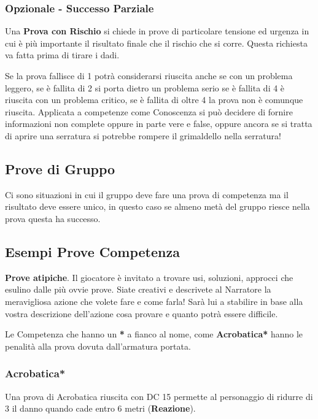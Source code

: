 \begin{multicols}{2}
\subsubsection{Opzionale - Successo Parziale}\hypertarget{successoparziale}{}\label{successoparziale}

Una \textbf{Prova con Rischio} si chiede in prove di particolare tensione ed urgenza in cui è più importante il risultato finale che il rischio che si corre. Questa richiesta va fatta prima di tirare i dadi.

Se la prova fallisce di 1 potrà considerarsi riuscita anche se con un problema leggero, se è fallita di 2 si porta dietro un problema serio se è fallita di 4 è riuscita con un problema critico, se è fallita di oltre 4 la prova non è comunque riuscita. Applicata a competenze come Conoscenza si può decidere di fornire informazioni non complete oppure in parte vere e false, oppure ancora se si tratta di aprire una serratura si potrebbe rompere il grimaldello nella serratura!

\subsection{Prove di Gruppo}\label{provedigruppo}\hypertarget{provedigruppo}{}

Ci sono situazioni in cui il gruppo deve fare una prova di competenza ma il risultato deve essere unico, in questo caso se almeno metà del gruppo riesce nella prova questa ha successo.

\subsection{Esempi Prove Competenza}\label{esempiprovecompetenza}\hypertarget{esempiprovecompetenze}{}

\textbf{Prove atipiche}. Il giocatore è invitato a trovare usi, soluzioni, approcci che esulino dalle più ovvie prove. Siate creativi e descrivete al Narratore la meravigliosa azione che volete fare e come farla! Sarà lui a stabilire in base alla vostra descrizione dell'azione cosa provare e quanto potrà essere difficile.

Le Competenza che hanno un \textbf{*} a fianco al nome, come \textbf{Acrobatica*} hanno le penalità alla prova dovuta dall'armatura portata.

\titlespacing*{\subsubsection}{0pt}{0.5em}{0.5em}\subsubsection*{Acrobatica*} \label{acrobatica}
Una prova di Acrobatica riuscita con DC 15 permette al personaggio di ridurre di 3 il danno quando cade entro 6 metri (\textbf{Reazione}).


\end{multicols}
